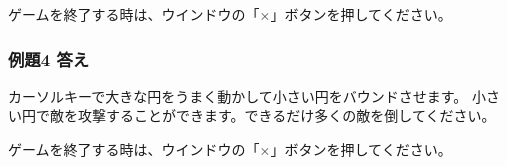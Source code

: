 ゲームを終了する時は、ウインドウの「×」ボタンを押してください。

\subsubsection*{例題4 答え}

カーソルキーで大きな円をうまく動かして小さい円をバウンドさせます。
小さい円で敵を攻撃することができます。できるだけ多くの敵を倒してください。

ゲームを終了する時は、ウインドウの「×」ボタンを押してください。














